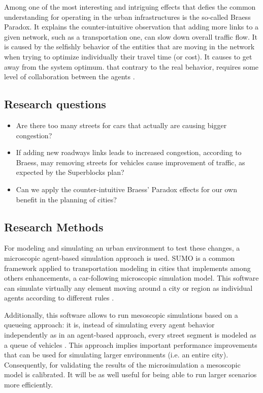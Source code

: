 \documentclass[11pt]{article}
\begin{document}
Among one of the most interesting and intriguing effects that defies the common understanding for operating in the urban infrastructures is the so-called Braess Paradox. It explains the counter-intuitive observation that adding more links to a given network, such as a transportation one, can slow down overall traffic flow. It is caused by the selfishly behavior of the entities that are moving in the network when trying to optimize individually their travel time (or cost). It causes to get away from the system optimum. that contrary to the real behavior, requires some level of collaboration between the agents \citep{Braess1969}.

\subsection {Research questions}

\begin{itemize}
\setlength\itemsep{0.05em}
    \item Are there too many streets for cars that actually are causing bigger congestion?
    \item If adding new roadways links leads to increased congestion, according to Braess, may removing streets for vehicles cause improvement of traffic, as expected by the Superblocks plan?
    \item Can we apply the counter-intuitive Braess’ Paradox effects for our own benefit in the planning of cities?
\end{itemize}

\subsection {Research Methods}

For modeling and simulating an urban environment to test these changes, a microscopic agent-based simulation approach is used. SUMO is a common framework applied to transportation modeling in cities that implements among others enhancements, a car-following microscopic simulation model. This software can simulate virtually any element moving around a city or region as individual agents according to different rules \citep{Lopez2018}.

Additionally, this software allows to run mesoscopic simulations based on a queueing approach: it is, instead of simulating every agent behavior independently as in an agent-based approach, every street segment is modeled as a queue of vehicles \citep{Eissfeldt2004}. This approach implies important performance improvements that can be used for simulating larger environments (i.e. an entire city). Consequently, for validating the results of the microsimulation a mesoscopic model is calibrated. It will be as well useful for being able to run larger scenarios more efficiently. 
\end{document}
